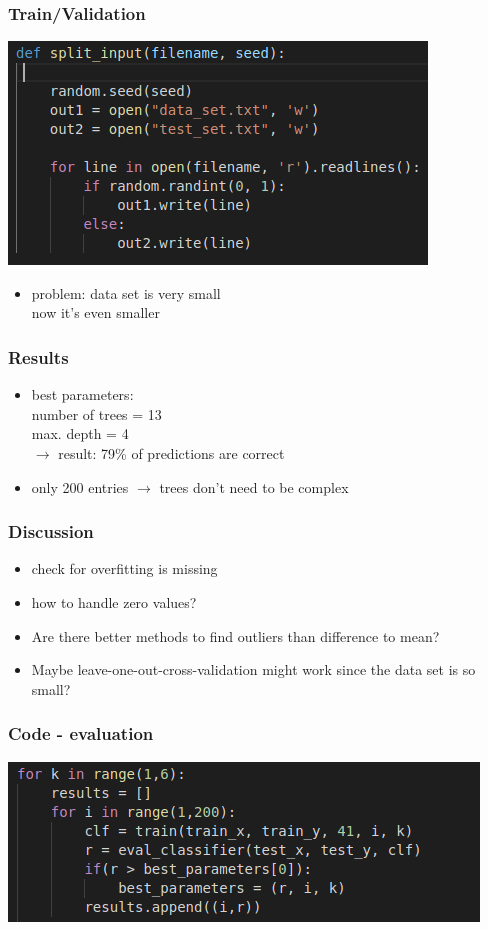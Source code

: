 \documentclass{beamer}
\begin{document}
\begin{frame}
\frametitle{Train/Validation}
\includegraphics[scale=0.6]
       {splitinput.png}
\begin{itemize}
\item{problem: data set is very small \\ now it's even smaller}
\end{itemize}
\end{frame}

\begin{frame}
\frametitle{Results}
\begin{itemize}
\item{best parameters: \\
number of trees = 13\\
max. depth = 4\\
$\rightarrow$ result: 79\% of predictions are correct}
\item{only 200 entries $\rightarrow$ trees don't need to be complex}
\end{itemize}
\end{frame}

\begin{frame}
\frametitle{Discussion}
\begin{itemize}
\item{check for overfitting is missing}
\item{how to handle zero values?}
\item{Are there better methods to find outliers than difference to mean?}
\item{Maybe leave-one-out-cross-validation might work since the data set is so small?} 
\end{itemize}
\end{frame}

\begin{frame}
\frametitle{Code - evaluation}
\includegraphics[scale=0.7]
       {code1.png}
\end{frame}
\end{document}
